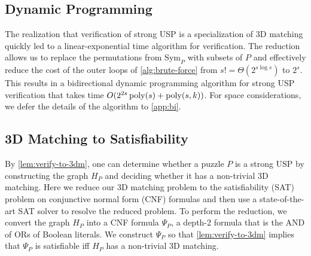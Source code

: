 \documentclass[11pt]{article}
\newcommand\Sym[1]{\ensuremath{\mathrm{Sym}_{#1}}}
\renewcommand\NP{\ensuremath{\mathsf{NP}}}
\begin{document}

\subsection{Dynamic Programming}

The realization that verification of strong USP is a specialization of
3D matching quickly led to a linear-exponential time algorithm for verification.  The reduction allows us to replace the
permutations from $\Sym{P}$ with subsets of $P$ and effectively reduce
the cost of the outer loops of \autoref{alg:brute-force} from $s! =
\Theta(2^{s\log s})$ to $2^s$.  This results in a bidirectional
dynamic programming algorithm for strong USP verification that takes
time $O(2^{2s} \operatorname{poly}(s) + \operatorname{poly}(s,k))$.  For space considerations, we defer the
details of the algorithm to \autoref{app:bi}.

\subsection{3D Matching to Satisfiability} 
\label{subsec:sat}

By \autoref{lem:verify-to-3dm}, one can determine whether a puzzle $P$
is a strong USP by constructing the graph $H_P$ and deciding whether it
has a non-trivial 3D matching.
Here we reduce
our 3D matching problem to the satisfiability (SAT) problem on conjunctive normal form (CNF) formulas and
then use a state-of-the-art SAT solver to
resolve the reduced problem. To perform the reduction, we convert the
graph $H_P$
into a CNF formula $\Psi_P$, a depth-2 formula that is the AND
of ORs of Boolean literals.  
We construct $\Psi_P$ so that \autoref{lem:verify-to-3dm} implies that
$\Psi_P$ is satisfiable iff $H_P$ has a non-trivial 3D
  matching.
\end{document}
